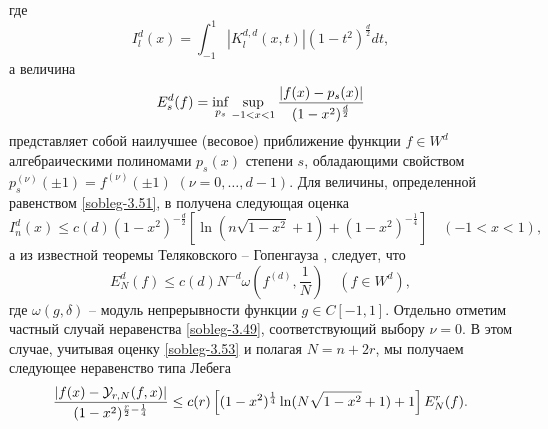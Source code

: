 где
\begin{equation}\label{sobleg-3.51}
I^{d}_{l}(x)= \int_{-1}^{1}|K^{d,d}_{l}(x,t)|(1-t^2)^{\frac{d}{2}}dt,
\end{equation}
а величина
\begin{equation}\label{sobleg-3.52}
E_s^d(f)=\inf_{p_s}\sup_{-1<x<1}{|f(x)-p_s(x)|\over (1-x^2)^\frac{d}{2}}
\end{equation}
представляет собой наилучшее (весовое) приближение функции $f\in W^d$ алгебраическими полиномами $p_s(x)$ степени
$s$, обладающими свойством $p_s^{(\nu)}(\pm1)=f^{(\nu)}(\pm1)$ $(\nu=0,\ldots, d-1)$. Для величины, определенной равенством  \eqref{sobleg-3.51}, в \cite{Shar15} получена следующая оценка
\begin{equation}\label{sobleg-3.53}
I^d_n(x)\le c(d)(1-x^2)^{-\frac{d}{2}}\left[\ln(n\sqrt{1-x^2}+1)+(1-x^2)^{-\frac14}\right]\quad(-1<x<1),
\end{equation}
а из известной теоремы Теляковского -- Гопенгауза \cite{TEL},\cite{GOP} следует, что
\begin{equation}\label{sobleg-3.54}
E_N^d(f)\le c(d)N^{-d}\omega(f^{(d)},\frac{1}{N})\quad (f\in W^d),
\end{equation}
где $\omega(g,\delta)$ -- модуль непрерывности функции $g\in C[-1,1]$. Отдельно отметим частный случай неравенства \eqref{sobleg-3.49}, соответствующий выбору $\nu=0$. В этом случае,  учитывая оценку \eqref{sobleg-3.53} и полагая $N=n+2r$, мы получаем следующее неравенство типа Лебега
\begin{equation}\label{sobleg-3.55}
{\left|f(x)-\mathcal{ Y}_{r,N}(f,x)\right|
\over(1-x^2)^{\frac{r}{2}-\frac14}}\le c(r)\left[(1-x^2)^{\frac14}\ln(N\sqrt{1-x^2}+1)+1\right]E^{r}_{N}(f).
  \end{equation}
